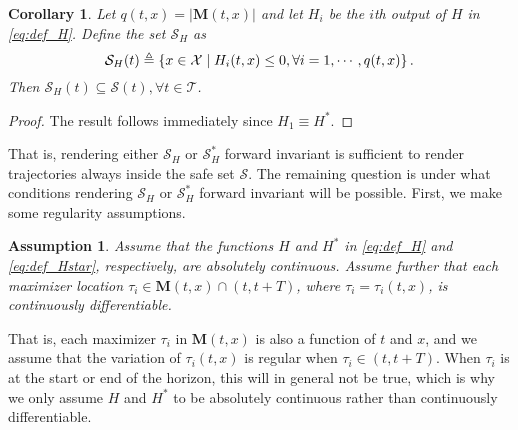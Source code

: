 \documentclass[10pt,conference]{ieeeconf}
\renewcommand{\(}{\left(}
\renewcommand{\)}{\right)}
\renewcommand{\[}{\left[}
\renewcommand{\]}{\right]}
\newtheorem{assumption}{Assumption}
\newtheorem{corollary}{Corollary}
\begin{document}
\begin{corollary}%
Let $q(t,x) = | \boldsymbol{M}(t,x) |$ and let ${H}_i$ be the $i$th output of $H$ in \eqref{eq:def_H}. {Define the} set $\mathcal{S}_H$ as
\begin{equation}
    \hspace{-3pt} \mathcal{S}_H(t) \triangleq \{ x \in \mathcal{X} \mid {H}_i(t,x) \leq 0, \forall i = 1, \cdots, q(t,x)\} {\,.} \hspace{-2pt}
\end{equation}
{Then} $\mathcal{S}_H(t) \subseteq \mathcal{S}(t), \forall t \in \mathcal{T}$.
\end{corollary}
\begin{proof}
The result follows immediately since  
${H}_1 \equiv H^*$. 
\end{proof}

That is, rendering either $\mathcal{S}_H$ or $\mathcal{S}_H^*$ forward invariant is sufficient to render trajectories always inside the safe set $\mathcal{S}$. The remaining question is under what conditions rendering $\mathcal{S}_H$ or $\mathcal{S}_H^*$ forward invariant will be possible. First, we make some regularity assumptions.

\begin{assumption}%
\label{as:differentiable}
Assume that the functions $H$ and $H^*$ in \eqref{eq:def_H} and \eqref{eq:def_Hstar}, respectively, are absolutely continuous. Assume further that each maximizer location $\tau_i \in \boldsymbol{M}(t,x) \cap (t,t+T)$, where $\tau_i = \tau_i(t,x)$, is continuously differentiable.
\end{assumption}

That is, each maximizer $\tau_i$ in $\boldsymbol{M}(t,x)$ is also a function of $t$ and $x$, and we assume that the variation of $\tau_i(t,x)$ is regular when $\tau_i \in (t,t+T)$. When $\tau_i$ is at the start or end of the horizon, this will in general not be true, which is why we only assume $H$ and $H^*$ to be absolutely continuous rather than continuously differentiable. %
\end{document}
